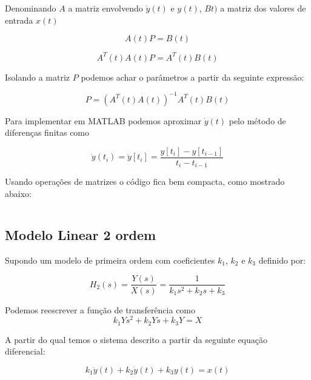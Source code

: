 \documentclass[a4paper,11pt]{article}
\begin{document}

Denominando $A$ a matriz envolvendo $\dot{y}(t)$ e $y(t)$, $Bt)$ a matriz dos valores de entrada $x(t)$

\begin{equation}
    A(t) P = B(t)
\end{equation}

\begin{equation}
    A^T(t)A(t) P = A^T(t) B(t)
\end{equation}

Isolando a matriz $P$ podemos achar o parâmetros a partir da seguinte expressão:

\begin{equation}
    P = \left(A^T(t) A(t)\right)^{-1} A^T(t) B(t)
\end{equation}

Para implementar em MATLAB podemos aproximar $\dot{y}(t)$ pelo método de diferenças finitas como

\begin{equation}
\dot{y}(t_i) = \dot{y}[t_i] = \frac{y[t_i] - y[t_{i-1}]}{t_i - t_{i-1}}
\end{equation}

Usando operações de matrizes o código fica bem compacta, como mostrado abaixo:

\inputminted{matlab}{../src/matlab/firstordertf.m}

\subsection{Modelo Linear 2 ordem}

Supondo um modelo de primeira ordem com coeficientes $k_1$, $k_2$ e $k_3$ definido por:

\begin{equation}
    H_2(s) = \frac{Y(s)}{X(s)} = \frac{1}{k_1 s^2+ k_2 s+ k_3}
\end{equation}


Podemos reescrever a função de transferência como
\begin{equation}
k_1 Ys^2 + k_2 Ys + k_3 Y  = X
\end{equation}

A partir do qual temos o sistema descrito a partir da seguinte equação diferencial:

\begin{equation}
k_1 \ddot{y}(t) + k_2 \dot{y}(t) + k_3 y(t) = x(t)
\end{equation}
\end{document}
